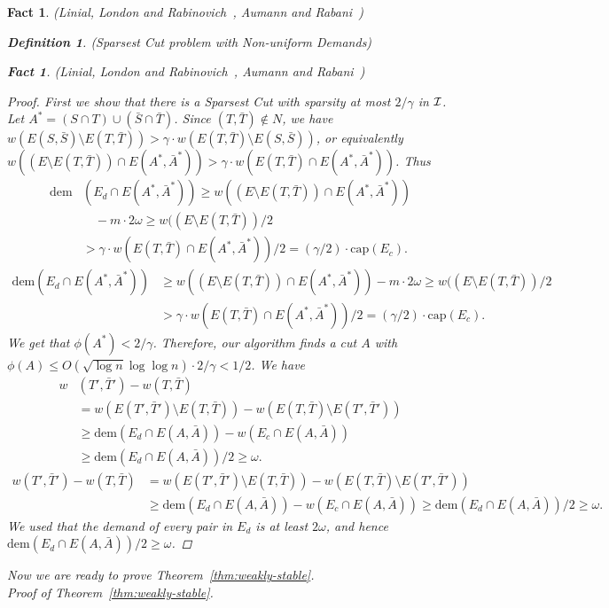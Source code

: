 \documentclass[twoside,leqno,twocolumn]{article}
\newtheorem{Definition}[theorem]{Definition}
\newtheorem{fact}[theorem]{Fact}
\newcommand{\N}{N}
\begin{document}
\begin{fact}{\sc (Linial, London and Rabinovich~\cite{LLR}, Aumann and Rabani~\cite{AR})}
\begin{Definition} {\sc (Sparsest Cut problem with Non-uniform Demands)}
\begin{fact}{\sc (Linial, London and Rabinovich~\cite{LLR}, Aumann and Rabani~\cite{AR})}
\begin{proof}
First we show that there is a Sparsest Cut with sparsity at most $2/\gamma$ in $\cal I$. Let $A^* = (S \cap T) \cup (\bar S \cap \bar T)$.
Since $(T,\bar T) \notin \N$, we have $w(E(S, \bar S)\setminus E(T, \bar T)) > \gamma\cdot w(E(T, \bar T )\setminus E(S, \bar S))$, or equivalently
$w((E\setminus E(T,\bar T)) \cap E(A^*,\bar A^*)) > \gamma \cdot w(E(T,\bar T) \cap E(A^*,\bar A^*))$. Thus
\ifSODA
\begin{align*}
\mathrm{dem}&(E_d \cap E(A^*,\bar A^*)) \geq w((E\setminus E(T,\bar T)) \cap E(A^*,\bar A^*)) \\
&\quad{}- m \cdot 2\omega \geq w((E\setminus E(T,\bar T))/2  \\
&> \gamma \cdot  w(E(T,\bar T) \cap E(A^*,\bar A^*))/2 = (\gamma/2) \cdot \mathrm{cap}(E_c).
\end{align*}
\else
\begin{align*}
\mathrm{dem}(E_d \cap E(A^*,\bar A^*)) &\geq w((E\setminus E(T,\bar T)) \cap E(A^*,\bar A^*)) - m \cdot 2\omega \geq w((E\setminus E(T,\bar T))/2  \\
&> \gamma \cdot  w(E(T,\bar T) \cap E(A^*,\bar A^*))/2 = (\gamma/2) \cdot \mathrm{cap}(E_c).
\end{align*}
\fi
We get that $\phi(A^*) < 2/\gamma$. Therefore, our algorithm finds a cut $A$ with $\phi(A) \leq O(\sqrt{\log n}\log\log n) \cdot  2/\gamma < 1/2$.
We have
\ifSODA
\begin{align*}
w&(T',\bar T') - w(T,\bar T) \\
&= w(E(T',\bar T')\setminus E(T,\bar T)) - w(E(T,\bar T)\setminus E(T',\bar T')) \\
&\geq \mathrm{dem}(E_d \cap E(A,\bar A)) - w(E_c \cap E(A,\bar A)) \\
&\geq  \mathrm{dem}(E_d \cap E(A,\bar A))/2 \geq
\omega.
\end{align*}
\else
\begin{align*}
w(T',\bar T') - w(T,\bar T) &= w(E(T',\bar T')\setminus E(T,\bar T)) - w(E(T,\bar T)\setminus E(T',\bar T')) \\
&\geq \mathrm{dem}(E_d \cap E(A,\bar A)) - w(E_c \cap E(A,\bar A)) \geq  \mathrm{dem}(E_d \cap E(A,\bar A))/2 \geq
\omega.
\end{align*}
\fi
We used that the demand of every pair in $E_d$ is at least $2\omega$, and hence $\mathrm{dem}(E_d \cap E(A,\bar A))/2 \geq
\omega$.
\end{proof}
Now we are ready to prove Theorem~\ref{thm:weakly-stable}.
\ifSODA\\[0.5em] \noindent \textit{Proof of Theorem~\ref{thm:weakly-stable}.}\\[0.25em]

\end{fact}
\end{Definition}
\end{fact}
\end{document}
